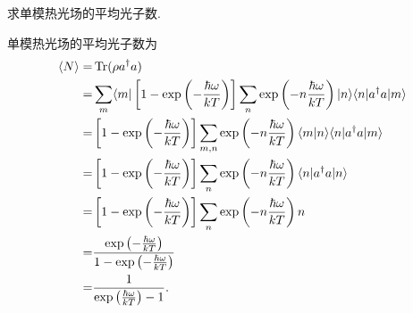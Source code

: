 \documentclass{assignment}
\begin{document}
\begin{prob}
    求单模热光场的平均光子数.
\end{prob}
\begin{sol}
    单模热光场的平均光子数为
    \begin{align}
        \notag\langle N\rangle=&\operatorname{Tr}(\rho a^{\dagger}a)\\
        \notag=&\sum_m\langle m\rvert\left[1-\exp\left(-\frac{\hbar\omega}{kT}\right)\right]\sum_n\exp\left(-n\frac{\hbar\omega}{kT}\right)\lvert n\rangle\langle n\rvert a^{\dagger}a\lvert m\rangle\\
        \notag=&\left[1-\exp\left(-\frac{\hbar\omega}{kT}\right)\right]\sum_{m,n}\exp\left(-n\frac{\hbar\omega}{kT}\right)\langle m\vert n\rangle\langle n\rvert a^{\dagger}a\lvert m\rangle\\
        \notag=&\left[1-\exp\left(-\frac{\hbar\omega}{kT}\right)\right]\sum_n\exp\left(-n\frac{\hbar\omega}{kT}\right)\langle n\rvert a^{\dagger}a\lvert n\rangle\\
        \notag=&\left[1-\exp\left(-\frac{\hbar\omega}{kT}\right)\right]\sum_n\exp\left(-n\frac{\hbar\omega}{kT}\right)n\\
        \notag=&\frac{\exp\left(-\frac{\hbar\omega}{kT}\right)}{1-\exp\left(-\frac{\hbar\omega}{kT}\right)}\\
        =&\frac{1}{\exp\left(\frac{\hbar\omega}{kT}\right)-1}.
    \end{align}
\end{sol}
\end{document}
